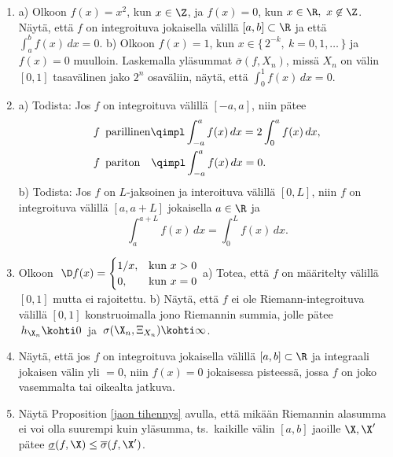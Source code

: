 \Harj
\begin{enumerate}

\item
a) Olkoon $f(x)=x^2$, kun $x\in\Z$, ja $f(x)=0$, kun $x\in\R,\ x\not\in\Z$. Näytä, että $f$ on
integroituva jokaisella välillä $[a,b]\subset\R$ ja että $\int_a^b f(x)\,dx=0$. \newline
b) Olkoon $f(x)=1$, kun $x\in\{\,2^{-k},\ k=0,1,\ldots\,\}$ ja $f(x)=0$ muulloin. Laskemalla
yläsummat $\overline{\sigma}(f,X_n)$, missä $X_n$ on välin $[0,1]$ tasavälinen jako $2^n$
osaväliin, näytä, että $\int_0^1 f(x)\,dx=0$.

\item
a) Todista: Jos $f$ on integroituva välillä $[-a,a]$, niin pätee
\begin{align*}
&f\,\ \text{parillinen}   \qimpl \int_{-a}^a f(x)\,dx = 2\int_0^a f(x)\,dx, \\
&f\,\ \text{pariton} \quad\qimpl \int_{-a}^a f(x)\,dx =0.
\end{align*}
b) Todista: Jos $f$ on $L$-jaksoinen ja interoituva välillä $[0,L]$, niin $f$ on integroituva
välillä $[a,a+L]$ jokaisella $a\in\R$ ja
\[
\int_{a}^{a+L} f(x)\,dx=\int_0^L f(x)\,dx.
\]

\item \label{H-int-5: Riemann-1}
Olkoon
$\ \D f(x)= \begin{cases}
            1/x, &\text{kun}\ x>0 \\ 0, &\text{kun}\ x=0
\end{cases}$ \vspace{1mm}\newline
a) Totea, että $f$ on määritelty välillä $[0,1]$ mutta ei rajoitettu. \newline
b) Näytä, että $f$ ei ole Riemann-integroituva välillä $[0,1]$ konstruoimalla jono Riemannin
summia, jolle pätee $\,h_{\X_n} \kohti 0\,$ ja $\,\sigma(\X_n,\Xi_{X_n}) \kohti \infty$.

\item
Näytä, että jos $f$ on integroituva jokaisella välillä $[a,b]\subset\R$ ja integraali jokaisen
välin yli $=0$, niin $f(x)=0$ jokaisessa pisteessä, jossa $f$ on joko vasemmalta tai oikealta
jatkuva.

\item %
Näytä Proposition \ref{jaon tihennys} avulla, että mikään Riemannin alasumma ei voi olla
suurempi kuin yläsumma, ts.\ kaikille välin $[a,b]$ jaoille $\X,\X'$ pätee
$\underline{\sigma}(f,\X)\le\overline{\sigma}(f,\X')$.


\end{enumerate}
